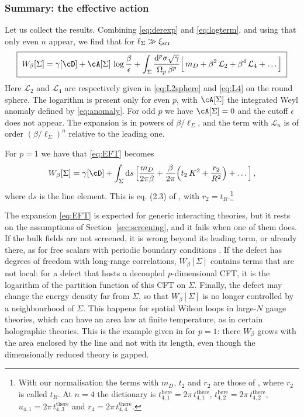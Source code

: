 \documentclass[a4paper,11pt]{article}
\newcommand{\xiscr}{\xi_{\rm scr}}
\newcommand{\dd}{\mathrm{d}}
\begin{document}
\subsubsection{Summary: the effective action}\label{sec:summary}

Let us collect the results. Combining \eqref{eq:derexp} and \eqref{eq:logterm}, and using that only even $n$ appear, we find that for $\ell_\Sigma\gg\xiscr$
\begin{equation}\label{eq:EFT}
	\boxed{\;
		W_\beta[\Sigma]
		=\gamma[\cD]+\cA[\Sigma]\,\log\frac{\beta}{\epsilon}
		+\int_\Sigma \frac{\dd^p\sigma\sqrt{\gamma}}{\Omega_p\,\beta^{p}}
		\Bigl[\,m_D+\beta^{2}\,\mathcal{L}_2+\beta^{4}\,\mathcal{L}_4+\dots\Bigr]\;}
\end{equation}
Here $\mathcal{L}_2$ and $\mathcal{L}_4$ are respectively given in \eqref{eq:L2sphere} and \eqref{eq:L4} on the round sphere. The logarithm is present only for even $p$, with $\cA[\Sigma]$ the integrated Weyl anomaly defined by \eqref{eq:anomaly}. For odd $p$ we have $\cA[\Sigma]=0$ and the cutoff $\epsilon$ does not appear. The expansion is in powers of $\beta/\ell_\Sigma$, and the term with $\mathcal{L}_n$ is of order $(\beta/\ell_\Sigma)^n$ relative to the leading one.

For $p=1$ we have that \eqref{eq:EFT} becomes 
\begin{equation}\label{eq:EFTline}
	W_\beta[\Sigma]=\gamma[\cD]+\int_\Sigma\dd s\,\Bigl[\frac{m_D}{2\pi\beta}+\frac{\beta}{2\pi}\Bigl(t_2\,K^2+\frac{r_2}{R^2}\Bigr)+\dots\Bigr]\, ,
\end{equation}
where $\dd s$ is the line element. 
This is eq. (2.3) of \cite{BMP}, with $r_2=t_R$.\footnote{With our normalisation the terms with $m_D$, $t_2$ and $r_2$ are those of \cite{BMP}, where $r_2$ is called $t_R$. At $n=4$ the dictionary is
$t_{4,1}^{\text{here}}=2\pi\,t_{4,1}^{\text{there}}$, $t_{4,2}^{\text{here}}=2\pi\,t_{4,2}^{\text{there}}$, $u_{4,1}=2\pi\,t_{4,3}^{\text{there}}$ and $r_4=2\pi\,t_{4,4}^{\text{there}}$.} 

The expansion \eqref{eq:EFT} is expected for generic interacting theories, but it rests on the assumptions of Section~\ref{sec:screening}, and it fails when one of them does. If the bulk fields are not screened, it is wrong beyond its leading term, or already there, as for free scalars with periodic boundary conditions \cite{BMP}. If the defect has degrees of freedom with long-range correlations, $W_\beta[\Sigma]$ contains terms that are not local: for a defect that hosts a decoupled $p$-dimensional CFT, it is the logarithm of the partition function of this CFT on $\Sigma$. Finally, the defect may change the energy density far from $\Sigma$, so that $W_\beta[\Sigma]$ is no longer controlled by a neighbourhood of $\Sigma$. This happens for spatial Wilson loops in large-$N$ gauge theories, which can have an area law at finite temperature, as in certain holographic theories. This is the example given in \cite{BMP} for $p=1$: there $W_\beta$ grows with the area enclosed by the line and not with its length, even though the dimensionally reduced theory is gapped.
\end{document}
